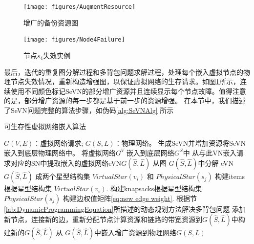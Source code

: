 \begin{figure}[htbp]
\centering
\begin{minipage}{0.4\textwidth}
\centering
\texttt{[image: figures/AugmentResource]}
\caption{增广的备份资源图}\label{fig:AugmentResource}
\end{minipage}
\begin{minipage}{0.4\textwidth}
\centering
\texttt{[image: figures/Node4Failure]}
\caption{节点$s_4$失效实例}\label{fig:Node4Failure}
\end{minipage}\vspace{\baselineskip}
\end{figure}

最后，迭代的重复图分解过程和多背包问题求解过程，处理每个嵌入虚拟节点的物理节点失效情况，重新构造增强图，以保证虚拟网络的生存请求。如图\ref{fig:Node4Failure}所示，连续使用不同颜色标记SeVN的部分增广资源并且连续显示每个节点故障。值得注意的是，部分增广资源的每一步都是基于前一步的资源增强。
在本节中，我们描述了SeVN问题完整的算法步骤，如伪码\ref{alg:SeVNAlg} 所示
\begin{algorithm}[htbp]
\label{alg:SeVNAlg}
\caption{可生存性虚拟网络嵌入算法}
\begin{algorithmic}[1]
\REQUIRE $G (V,E)$：虚拟网络请求; $G (S,L)$：物理网络。
\ENSURE 生成SeVN并增加资源将SeVN嵌入到底层物理网络中。
\STATE 将虚拟网络$G^V$ 嵌入\cite{liu2011completing}到底层网络$G^S$中
\STATE 从与此VN嵌入请求对应的SN中提取嵌入的虚拟网络eVN$G\left( {\hat S,\hat L} \right)$
\STATE  从图 $G\left( {\hat S,\hat L} \right)$中分解 eVN $G\left( {\hat S,\hat L} \right)$ 成两个星型结构集 $VirtualStar(v_i)$ 和 $PhysicalStar(s_j)$
\STATE 构建items根据星型结构集 $VirtualStar(v_i)$.
\STATE 构建knapsacks根据星型结构集$PhysicalStar(s_j)$
\STATE 构建边权值矩阵\ref{eq:new edge weight}.
\STATE 根据节\ref{lab:DynamicProgrammingEquation}所描述的动态规划方法解决多背包问题
\STATE 添加新节点，连接新的边，重新分配节点计算资源和链路的带宽资源到$G\left( {\hat S,\hat L} \right)$中构建新的$G\left( {\hat S,\hat L} \right)$
\ENDFOR
\STATE 从 $G\left( {\hat S,\hat L} \right)$中嵌入增广资源到物理网络$G(S,L)$
\end{algorithmic}
\end{algorithm}
